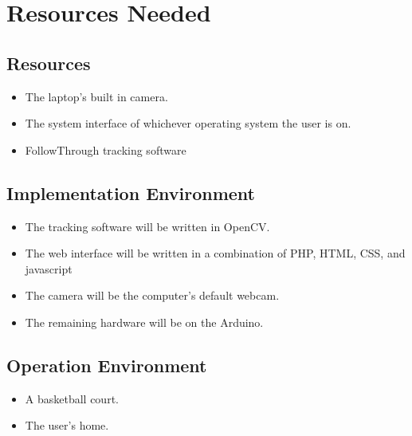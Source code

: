\chapter{Resources Needed}

\section{Resources}
\begin{itemize}
    \item The laptop’s built in camera.
    \item The system interface of whichever operating system the user is on.
    \item FollowThrough tracking software
\end{itemize}

\section{Implementation Environment}
\begin{itemize}
    \item The tracking software will be written in OpenCV.
    \item The web interface will be written in a combination of PHP, HTML, CSS, and javascript
    \item The camera will be the computer’s default webcam.
    \item The remaining hardware will be on the Arduino.
\end{itemize}

\section{Operation Environment}
\begin{itemize}
    \item A basketball court.
    \item The user’s home.
\end{itemize}

